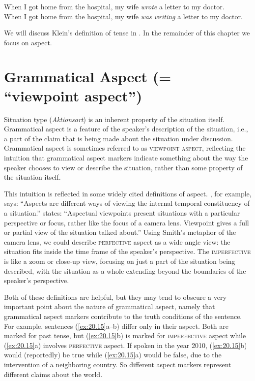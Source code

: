 \ea \label{ex:20.14}
\ea  When I got home from the hospital, my wife \textit{wrote} a letter to my doctor.\\
\ex When I got home from the hospital, my wife \textit{was writing} a letter to my doctor.
                       \z
\z


We will discuss Klein’s definition of tense in . In the remainder of this chapter we focus on aspect.


\section{Grammatical Aspect (= “viewpoint aspect”)}\label{sec:20.4} 

Situation type (\textit{Aktionsart}) is an inherent property of the situation itself. Grammatical aspect is a feature of the speaker’s description of the situation, i.e., a part of the claim that is being made about the situation under discussion. Grammatical aspect is sometimes referred to as \textsc{viewpoint aspect}, reflecting the intuition that grammatical aspect markers indicate something about the way the speaker chooses to view or describe the situation, rather than some property of the situation itself.



This intuition is reflected in some widely cited definitions of aspect. \citet[3]{Comrie1976}, for example, says: “Aspects are different ways of viewing the internal temporal constituency of a situation.” \citet[2--3]{Smith1997} states: “Aspectual viewpoints present situations with a particular perspective or focus, rather like the focus of a camera lens. Viewpoint gives a full or partial view of the situation talked about.” Using Smith’s metaphor of the camera lens, we could describe \textsc{perfective} aspect as a wide angle view: the situation fits inside the time frame of the speaker’s perspective. The \textsc{imperfective} is like a zoom or close-up view, focusing on just a part of the situation being described, with the situation as a whole extending beyond the boundaries of the speaker’s perspective.



Both of these definitions are helpful, but they may tend to obscure a very important point about the nature of grammatical aspect, namely that grammatical aspect markers contribute to the truth conditions of the sentence. For example, sentences (\ref{ex:20.15}a--b) differ only in their aspect. Both are marked for past tense, but (\ref{ex:20.15}b) is marked for \textsc{imperfective} aspect while (\ref{ex:20.15}a) involves \textsc{perfective} aspect. If spoken in the year 2010, (\ref{ex:20.15}b) would (reportedly) be true while (\ref{ex:20.15}a) would be false, due to the intervention of a neighboring country. So different aspect markers represent different claims about the world.


